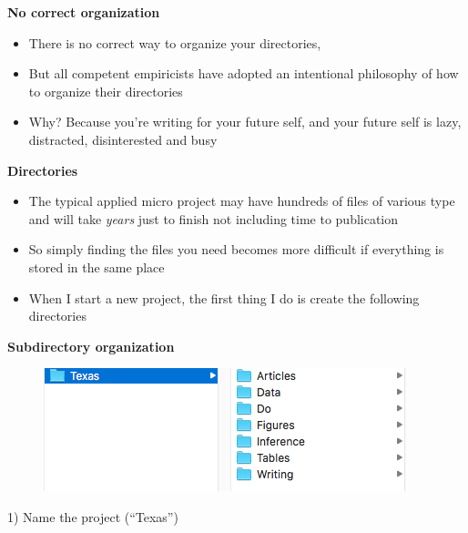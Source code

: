 \documentclass[notes=show]{beamer}
\begin{document}
\begin{frame}[plain]
\begin{center}
\textbf{No correct organization}
\end{center}

\begin{itemize}
\item There is no correct way to organize your directories, 
\item But all competent empiricists have adopted an intentional philosophy of how to organize their directories
\item Why? Because you're writing for your future self, and your future self is lazy, distracted, disinterested and busy
\end{itemize}

\end{frame}




\begin{frame}
\begin{center}
\textbf{Directories}
\end{center}

\begin{itemize}
\item The typical applied micro project may have hundreds of files of various type and will take \emph{years} just to finish not including time to publication
\item So simply finding the files you need becomes more difficult if everything is stored in the same place
\item When I start a new project, the first thing I do is create the following directories
\end{itemize}

\end{frame}


\begin{frame}[plain]
\begin{center}
\textbf{Subdirectory organization}
\end{center}


\begin{figure}

\includegraphics{./lecture_includes/directories.png}
\end{figure}

1) Name the project (``Texas'')

\end{frame}
\end{document}
